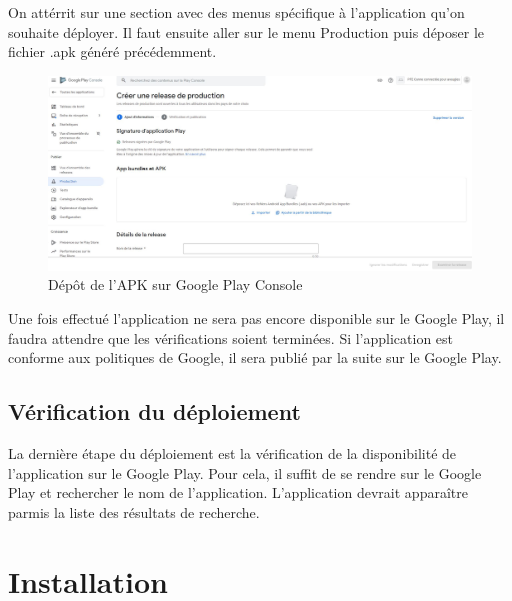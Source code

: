 \documentclass[UTF8]{EPURapport}
\begin{document}
On attérrit sur une section avec des menus spécifique à l'application qu'on souhaite déployer. Il faut ensuite aller sur le menu Production puis déposer le fichier .apk généré précédemment.
\newpage

\begin{figure}[h!]
\centering
  \includegraphics[width=1\textwidth]{images/release.JPG}
  \caption{Dépôt de l'APK sur Google Play Console}
  \label{fig:depotapk}
\end{figure}

Une fois effectué l'application ne sera pas encore disponible sur le Google Play, il faudra attendre que les vérifications soient terminées. Si l'application est conforme aux politiques de Google, il sera publié par la suite sur le Google Play.

\section{Vérification du déploiement}
La dernière étape du déploiement est la vérification de la disponibilité de l'application sur le Google Play. Pour cela, il suffit de se rendre sur le Google Play et rechercher le nom de l'application. L'application devrait apparaître parmis la liste des résultats de recherche.

\chapter{Installation}
\end{document}
